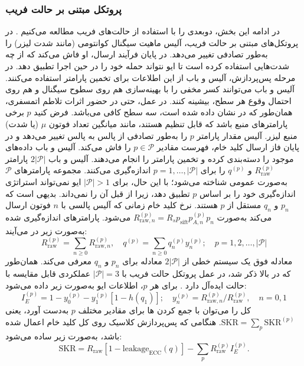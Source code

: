 \subsubsection{پروتکل مبتنی بر حالت فریب}
\label{subsec:7-4-3-2}
در ادامه این بخش،  دوبعدی را با استفاده از حالت‌های فریب مطالعه می‌کنیم \cite{7-35, 7-69, 7-70, 7-71, 7-72, 7-73, 7-74, 7-75, 7-76}. در پروتکل‌های مبتنی بر حالت فریب، آلیس ماهیت سیگنال کوانتومی (مانند شدت لیزر) را به‌طور تصادفی تغییر می‌دهد. در پایان فرآیند ارسال، او فاش می‌کند که از چه شدت‌هایی استفاده کرده است تا ایو نتواند حمله خود را در حین اجرا تطبیق دهد. در مرحله پس‌پردازش، آلیس و باب از این اطلاعات برای تخمین پارامتر استفاده می‌کنند. آلیس و باب می‌توانند کسر مخفی را با بهینه‌سازی هم روی سطوح سیگنال و هم روی احتمال وقوع هر سطح، بیشینه کنند. در عمل، حتی در حضور اثرات تلاطم اتمسفری، همان‌طور که در \cite{7-77} نشان داده شده است، سه سطح کافی می‌باشد. فرض کنید $p$ برخی پارامترهای منبع باشد که قابل تنظیم هستند، مانند میانگین تعداد فوتون $\mu$ (یا شدت) منبع لیزر. آلیس مقدار پارامتر $p$ را به‌طور تصادفی از پالس به پالس تغییر می‌دهد و در پایان فاز ارسال کلید خام، فهرست مقادیر $p \in \mathcal{P}$ را فاش می‌کند. آلیس و باب داده‌های موجود را دسته‌بندی کرده و تخمین پارامتر را انجام می‌دهند. آلیس و باب $2|\mathcal{P}|$ پارامتر $R_{\text{raw}}^{(p)}$ و $q^{(p)}$ را برای $p = 1, \dots, |\mathcal{P}|$ اندازه‌گیری می‌کنند. مجموعه پارامترهای $\mathcal{P}$ به‌صورت عمومی شناخته می‌شود؛ با این حال، برای $|\mathcal{P}| > 1$ ایو نمی‌تواند استراتژی اندازه‌گیری خود را بر اساس $p$ تطبیق دهد، زیرا از قبل آن را نمی‌داند. بدیهی است که $p_n$ و $q_n$ مستقل از $p$ هستند. نرخ کلید خام زمانی که آلیس پالسی با $n$ فوتون ارسال می‌کند به‌صورت $R_{\text{raw},n}^{(p)} = R_s p_{\text{sift}} p_{A,n}^{(p)} p_n$ می‌شود. پارامترهای اندازه‌گیری شده به‌صورت زیر در می‌آیند:
\begin{equation}
	R_{\text{raw}}^{(p)} = \sum_{n \geq 0} R_{\text{raw},n}^{(p)}, \quad q^{(p)} = \sum_{n \geq 0} q_n^{(p)} y_n^{(p)}; \quad p = 1, 2, \dots, |\mathcal{P}|
	\label{eq:7-64}
\end{equation}
معادله فوق یک سیستم خطی از $2|\mathcal{P}|$ معادله برای $p_n$ و $q_n$ معرفی می‌کند. همان‌طور که در بالا ذکر شد، در عمل پروتکل حالت فریب با $|\mathcal{P}| = 3$ عملکردی قابل مقایسه با حالت ایده‌آل دارد \cite{7-76, 7-77}. برای هر $p$، اطلاعات ایو به‌صورت زیر داده می‌شود:
\begin{equation}
	I_E^{(p)} = 1 - y_0^{(p)} - y_1^{(p)} [1 - h(q_1)]; \quad y_n^{(p)} = R_{\text{raw},n}^{(p)}/R_{\text{raw}}^{(p)}, \quad n = 0, 1
	\label{eq:7-65}
\end{equation}
 کل را می‌توان با جمع کردن ها برای مقادیر مختلف $p$ به‌دست آورد، یعنی $\text{SKR} = \sum_p \text{SKR}^{(p)}$. هنگامی که پس‌پردازش کلاسیک روی کل کلید خام اعمال شده باشد،  به‌صورت زیر ساده می‌شود:
\begin{equation}
	\text{SKR} = R_{\text{raw}} [1 - \text{leakage}_{\text{ECC}}(q)] - \sum_p R_{\text{raw}}^{(p)} I_E^{(p)}.
	\label{eq:7-66}
\end{equation}






